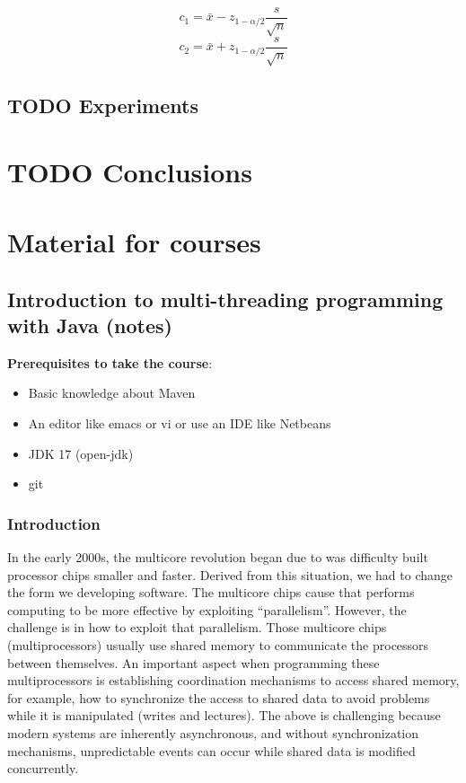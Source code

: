 \documentclass{latex/classes/thesis}
\begin{document}
\begin{equation}
c_1 = \bar{x} - z_{1 - \alpha/2}\frac{s}{\sqrt{n}}
\end{equation}
\begin{equation}
c_2 = \bar{x} + z_{1 - \alpha/2}\frac{s}{\sqrt{n}}
\end{equation}


\section{{\bfseries\sffamily TODO} Experiments}
\label{sec:orgc267531}


\chapter{{\bfseries\sffamily TODO} Conclusions}
\label{sec:orgb2c1c5a}


\chapter{Material for courses}
\label{sec:org39e22c9}

\section{Introduction to multi-threading programming with Java (notes)}
\label{sec:org843edb4}
\textbf{Prerequisites to take the course}:
\begin{itemize}
\item Basic knowledge about Maven
\item An editor like emacs or vi or use an IDE like Netbeans
\item JDK 17 (open-jdk)
\item git
\end{itemize}

\subsection{Introduction}
\label{sec:org681edd2}

In the early 2000s, the multicore revolution began due to was difficulty
built processor chips smaller and faster. Derived from this situation, we had
to change the form we developing software. The multicore chips cause that
performs computing to be more effective by exploiting
``parallelism''. However, the challenge is in how to exploit that
parallelism. Those multicore chips (multiprocessors) usually use shared
memory to communicate the processors between themselves. An important aspect
when programming these multiprocessors is establishing coordination
mechanisms to access shared memory, for example, how to synchronize the
access to shared data to avoid problems while it is manipulated (writes and
lectures). The above is challenging because modern systems are inherently
asynchronous, and without synchronization mechanisms, unpredictable events
can occur while shared data is modified concurrently.
\end{document}

